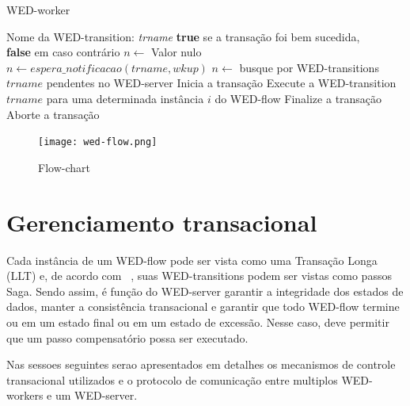 \documentclass[conference]{IEEEtran}
\begin{document}
\begin{algorithm}
\caption{WED-worker}
\label{alg1}
\begin{algorithmic}[1]
\REQUIRE Nome da WED-transition: \emph{trname}
\ENSURE \textbf{true} se a transação foi bem sucedida,\\
         \hspace{23pt}\textbf{false} em caso contrário
\LOOP
\STATE $n \leftarrow$ Valor nulo
\STATE $n \leftarrow espera\_notificacao(trname,wkup)$
\STATE $n \leftarrow $ busque por WED-transitions $trname$ pendentes no WED-server
\ENDIF
\ENDWHILE
\STATE Inicia a transação 
\STATE Execute a WED-transition $trname$ para uma determinada instância $i$ do WED-flow
\STATE Finalize a transação
\RETURN \TRUE
\ELSE
\STATE Aborte a transação
\RETURN \FALSE
\ENDIF  
\ENDLOOP

\end{algorithmic}
\end{algorithm}

\begin{figure}[!t]
\centering
\texttt{[image: wed-flow.png]}
\caption{Flow-chart}
\label{fig_wf}
\end{figure}

\section{Gerenciamento transacional}
Cada instância de um WED-flow pode ser vista como uma Transação Longa (LLT) e, de acordo com ~\cite{SGD87},
suas WED-transitions podem ser vistas como passos Saga. Sendo assim, é função do WED-server garantir a integridade dos estados
de dados, manter a consistência transacional e garantir que todo WED-flow termine ou em um estado final ou em um estado
de excessão. Nesse caso, deve permitir que um passo compensatório possa ser executado. 
\par
Nas sessoes seguintes serao apresentados em detalhes os mecanismos de controle transacional utilizados e o protocolo de
comunicação entre multiplos WED-workers e um WED-server.

\end{document}
